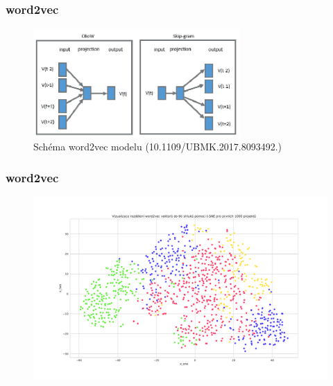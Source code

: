 \documentclass{beamer}
\begin{document}
\begin{frame}
\frametitle{word2vec}

  \begin{figure}[t]
      \centering
      \includegraphics[width=0.7\textwidth,height=\textheight,keepaspectratio]{figures/word2vec_diagram.png}
      \caption{Schéma word2vec modelu {\tiny (10.1109/UBMK.2017.8093492.)}}
      \label{fig:w2vd}
  \end{figure}

\end{frame}


\begin{frame}
\frametitle{word2vec}

  \begin{figure}[t]
      \centering
      \includegraphics[width=\textwidth,height=\textheight,keepaspectratio]{figures/word2vec_tsne.pdf}
      \label{fig:tsne2}
  \end{figure}

\end{frame}
\end{document}
